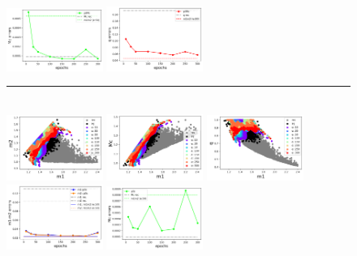 \documentclass[prd,aps,twocolumn,a4paper,showkeys,nofootinbib]{revtex4-1}
\begin{document}
\begin{figure}[]
  \includegraphics[width=0.28\textwidth]{./Figs/p3Mc_err_Mc.png}
  \includegraphics[width=0.28\textwidth]{./Figs/p3Mc_err_q.png} \\
  \rule[1ex]{14cm}{0.5pt}\\
  \includegraphics[width=0.28\textwidth]{./Figs/p3s_rainbow_m1m2.png}
  \includegraphics[width=0.28\textwidth]{./Figs/p3s_rainbow_m1Mc.png}
  \includegraphics[width=0.28\textwidth]{./Figs/p3s_rainbow_m1q.png} \\
  \includegraphics[width=0.28\textwidth]{./Figs/p3s_err_m1m2.png}
  \includegraphics[width=0.28\textwidth]{./Figs/p3s_err_Mc.png}

\end{figure}
\end{document}
